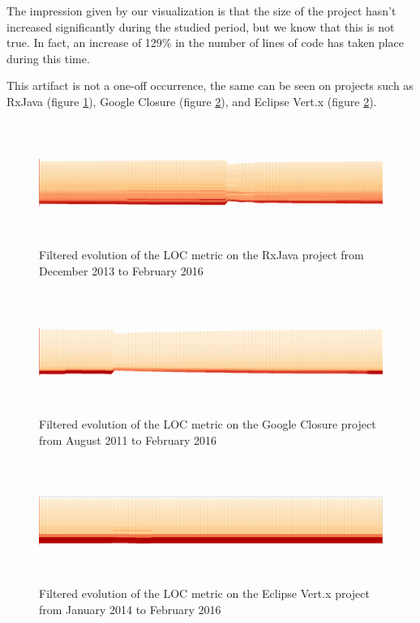 The impression given by our visualization is that the size of the project hasn't increased significantly during the studied period, but we know that this is not true. In fact, an increase of 129\% in the number of lines of code has taken place during this time.

This artifact is not a one-off occurrence, the same can be seen on projects such as RxJava (figure \ref{fig:stream_rxjava}), Google Closure (figure \ref{fig:stream_closure}), and Eclipse Vert.x (figure \ref{fig:stream_closure}).

\begin{figure}[H]
  \centering
  \includegraphics[width=1.0\textwidth,height=4.0cm]{figures/stream_rxjava.png}
  \caption{Filtered evolution of the LOC metric on the RxJava project from December 2013 to February 2016}
  \label{fig:stream_rxjava}
\end{figure}

\begin{figure}[H]
  \centering
  \includegraphics[width=1.0\textwidth,height=4.0cm]{figures/stream_closure.png}
  \caption{Filtered evolution of the LOC metric on the Google Closure project from August 2011 to February 2016}
  \label{fig:stream_closure}
\end{figure}

\begin{figure}[H]
  \centering
  \includegraphics[width=1.0\textwidth,height=4.0cm]{figures/stream_vertx.png}
  \caption{Filtered evolution of the LOC metric on the Eclipse Vert.x project from January 2014 to February 2016}
  \label{fig:stream_vertx}
\end{figure}

